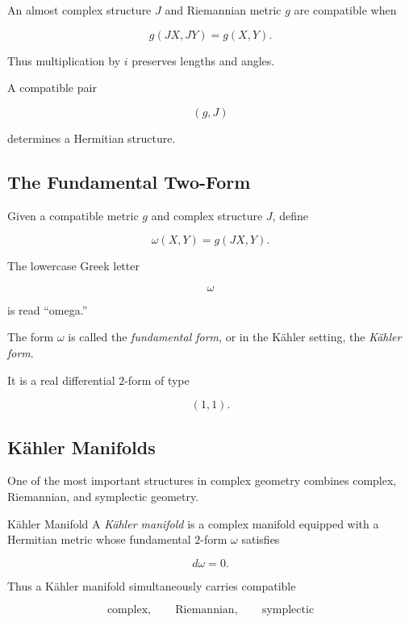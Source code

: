 An almost complex structure \(J\) and Riemannian metric \(g\) are compatible
when

\[
\boxed{
g(JX,JY)=g(X,Y).
}
\]

Thus multiplication by \(i\) preserves lengths and angles.

A compatible pair

\[
(g,J)
\]

determines a Hermitian structure.

\subsection{The Fundamental Two-Form}
\label{subsec:fundamental-two-form}

Given a compatible metric \(g\) and complex structure \(J\), define

\[
\boxed{
\omega(X,Y)=g(JX,Y).
}
\]

The lowercase Greek letter

\[
\omega
\]

is read ``omega.''

The form \(\omega\) is called the \emph{fundamental form}, or in the
K\"ahler setting, the \emph{K\"ahler form}.

It is a real differential \(2\)-form of type

\[
(1,1).
\]

\subsection{K\"ahler Manifolds}
\label{subsec:kahler-manifolds}

One of the most important structures in complex geometry combines complex,
Riemannian, and symplectic geometry.

\begin{definitionbox}{K\"ahler Manifold}
A \emph{K\"ahler manifold} is a complex manifold equipped with a Hermitian
metric whose fundamental \(2\)-form \(\omega\) satisfies

\[
\boxed{d\omega=0.}
\]
\end{definitionbox}

Thus a K\"ahler manifold simultaneously carries compatible

\[
\boxed{
\text{complex},
\qquad
\text{Riemannian},
\qquad
\text{symplectic}
}
\]


